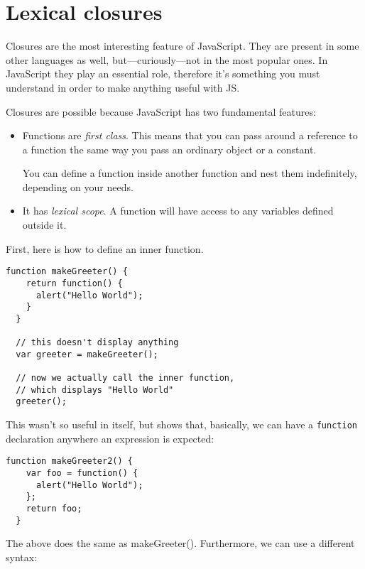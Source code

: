 \section{Lexical closures}\label{sec:closures}

Closures are the most interesting feature of JavaScript.  They are present in
some other languages as well, but—curiously—not in the most popular ones.  In
JavaScript they play an essential role, therefore it's something you must
understand in order to make anything useful with JS.

Closures are possible because JavaScript has two fundamental features:

\begin{itemize}

  \item Functions are \textit{first class}.  This means that you can pass
    around a reference to a function the same way you pass an ordinary object
    or a constant.

    You can define a function inside another function and nest them
    indefinitely, depending on your needs.

  \item It has \textit{lexical scope}.  A function will have access to any
    variables defined outside it.

\end{itemize}

First, here is how to define an inner function.

\begin{lstlisting}[nolol]
  function makeGreeter() {
    return function() {
      alert("Hello World");
    }
  }

  // this doesn't display anything
  var greeter = makeGreeter();

  // now we actually call the inner function,
  // which displays "Hello World"
  greeter();
\end{lstlisting}

This wasn't so useful in itself, but shows that, basically, we can have a
\lstinline{function} declaration anywhere an expression is expected:

\begin{lstlisting}[nolol]
  function makeGreeter2() {
    var foo = function() {
      alert("Hello World");
    };
    return foo;
  }
\end{lstlisting}

The above does the same as makeGreeter().  Furthermore, we can use a different
syntax:

